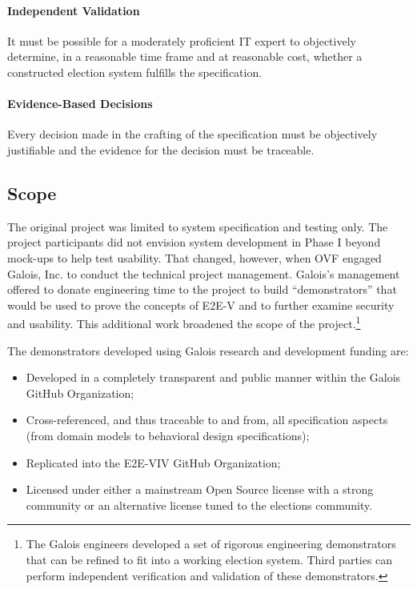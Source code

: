 \paragraph{Independent Validation}
It must be possible for a moderately proficient IT expert to
objectively determine, in a reasonable time frame and at reasonable
cost, whether a constructed election system fulfills the
specification.

\paragraph{Evidence-Based Decisions}
Every decision made in the crafting of the specification must be
objectively justifiable and the evidence for the decision must be
traceable.

\subsection{Scope}
\label{sec:scope}

The original project was limited to system specification and testing
only. The project participants did not envision system development in
Phase I beyond mock-ups to help test usability. That changed, however,
when OVF engaged Galois, Inc. to conduct the technical project
management. Galois’s management offered to donate engineering time to
the project to build ``demonstrators'' that would be used to prove the
concepts of E2E-V and to further examine security and usability. This
additional work broadened the scope of the project.\footnote{The
  Galois engineers developed a set of rigorous engineering
  demonstrators that can be refined to fit into a working election
  system. Third parties can perform independent verification and
  validation of these demonstrators.}

The demonstrators developed using Galois research and development
funding are:

\begin{itemize}
\item Developed in a completely transparent and public manner within
  the Galois GitHub Organization;
\item Cross-referenced, and thus traceable to and from, all
  specification aspects (from domain models to behavioral design
  specifications);
\item Replicated into the E2E-VIV GitHub Organization;
\item Licensed under either a mainstream Open Source license with a
  strong community or an alternative license tuned to the elections
  community.
\end{itemize}

